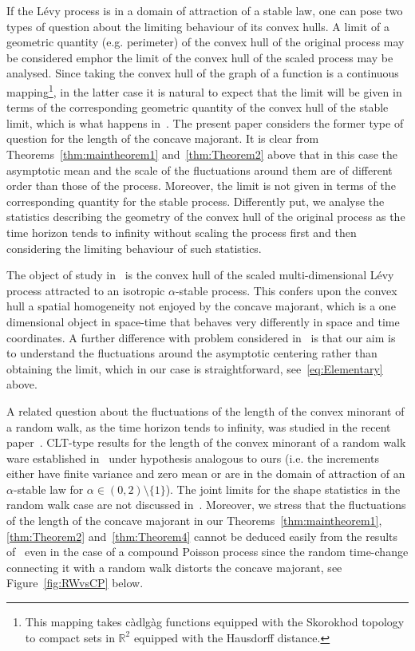 \documentclass[AHL,Unicode,longabstracts,published]{cedram}
\newcommand\R{\mathbb{R}}
\newcommand\1{\mathds{1}}
\newcommand\cadlag{{càdlgàg}}
\begin{document}
If the Lévy process is in a domain of attraction of a stable law, one can pose two types of question about the limiting behaviour of its convex hulls. A limit of a geometric quantity (e.g. perimeter) of the convex hull of the original process may be considered emph{or} the limit of the convex hull of the scaled process may be analysed. Since taking the convex hull of the graph of a function is a continuous mapping\footnote{This mapping takes \cadlag{} functions equipped with the Skorokhod topology to compact sets in $\R^2$ equipped with the Hausdorff distance.}, in the latter case it is natural to expect that the limit will be given in terms of the corresponding geometric quantity of the convex hull of the stable limit, which is what happens in~\cite[Section~5]{MR3564216}. The present paper considers the former type of question for the length of the concave majorant. It is clear from Theorems~\ref{thm:maintheorem1} and~\ref{thm:Theorem2} above that in this case the asymptotic mean and the scale of the fluctuations around them are of different order than those of the process. Moreover, the limit is not given in terms of the corresponding quantity for the stable process. Differently put, we analyse the statistics describing the geometry of the convex hull of the original process as the time horizon tends to infinity without scaling the process first and then considering the limiting behaviour of such statistics.


The object of study in~\cite{MR3564216} is the convex hull of the scaled multi-dimensional Lévy process attracted to an isotropic $\alpha$-stable process. This confers upon the convex hull a spatial homogeneity not enjoyed by the concave majorant, which is a one dimensional object in space-time that behaves very differently in space and time coordinates. A further difference with problem considered in~\cite{MR3564216} is that our aim is to understand the fluctuations around the asymptotic centering rather than obtaining the limit, which in our case is straightforward, see~\eqref{eq:Elementary} above.


A related question about the fluctuations of the length of the convex minorant of a random walk, as the time horizon tends to infinity, was studied in the recent paper~\cite{RWpaper}. CLT-type results for the length of the convex minorant of a random walk ware established in~\cite{RWpaper} under hypothesis analogous to ours (i.e. the increments either have finite variance and zero mean or are in the domain of attraction of an $\alpha$-stable law for $\alpha \in (0,2)\setminus\{1\}$). The joint limits for the shape statistics in the random walk case are not discussed in~\cite{RWpaper}. Moreover, we stress that the fluctuations of the length of the concave majorant in our Theorems~\ref{thm:maintheorem1}, \ref{thm:Theorem2} and~\ref{thm:Theorem4} cannot be deduced easily from the results of~\cite{RWpaper} even in the case of a compound Poisson process since the random time-change connecting it with a random walk distorts the concave majorant, see Figure~\ref{fig:RWvsCP} below.
\end{document}
